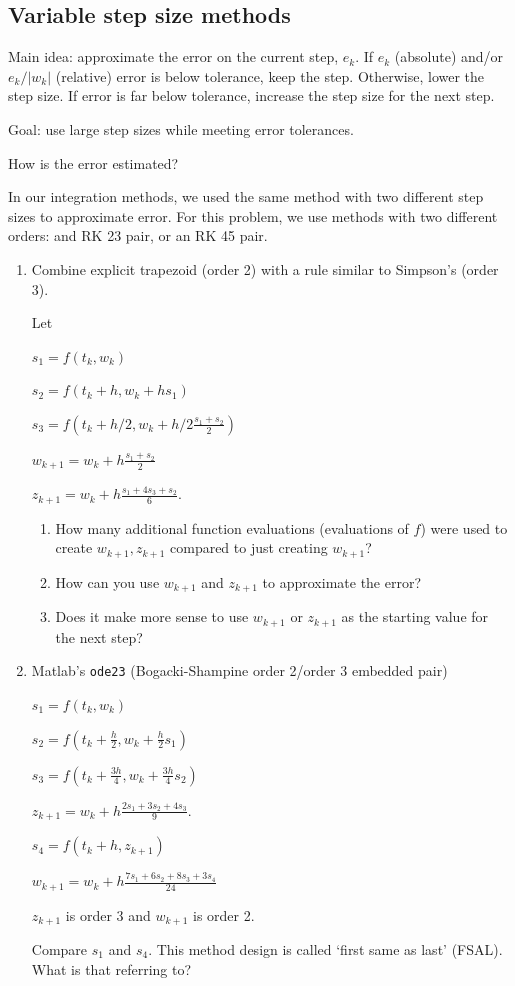 \documentclass[12pt,letterpaper,noanswers]{exam}
\begin{document}
\subsection*{Variable step size methods}

Main idea: approximate the error on the current step, $e_k$.  If $e_k$ (absolute) and/or $e_k/\vert w_k\vert$ (relative) error is below tolerance, keep the step.  Otherwise, lower the step size.  If error is far below tolerance, increase the step size for the next step.

Goal: use large step sizes while meeting error tolerances.

How is the error estimated?

In our integration methods, we used the same method with two different step sizes to approximate error.  For this problem, we use methods with two different orders: and RK 23 pair, or an RK 45 pair.

\begin{enumerate}[resume]
\item Combine explicit trapezoid (order 2) with a rule similar to Simpson's (order 3).

Let

$s_1 = f(t_k,w_k)$

$s_2 = f(t_k + h, w_k + hs_1)$

$s_3 = f\left(t_k+ h/2, w_k + h/2\frac{s_1+s_2}{2}\right)$

$w_{k+1} = w_k + h\frac{s_1+s_2}{2}$

$z_{k+1} = w_k + h\frac{s_1+4s_3+s_2}{6}$.

\begin{enumerate}
\item How many additional function evaluations (evaluations of $f$) were used to create $w_{k+1}, z_{k+1}$ compared to just creating $w_{k+1}$?

\item How can you use $w_{k+1}$ and $z_{k+1}$ to approximate the error?

\item Does it make more sense to use $w_{k+1}$ or $z_{k+1}$ as the starting value for the next step?
\end{enumerate}
\item Matlab's \texttt{ode23} (Bogacki-Shampine order 2/order 3 embedded pair)

$s_1 = f(t_k,w_k)$

$s_2 = f(t_k + \frac{h}{2}, w_k + \frac{h}{2}s_1)$

$s_3 = f(t_k + \frac{3h}{4}, w_k + \frac{3h}{4}s_2)$

$z_{k+1} = w_k + h\frac{2s_1+3s_2+4s_3}{9}$.

$s_4 = f(t_k+ h, z_{k+1})$

$w_{k+1} = w_k + h\frac{7s_1+6s_2+8s_3+3s_4}{24}$

$z_{k+1}$ is order 3 and $w_{k+1}$ is order 2.

Compare $s_1$ and $s_4$.  This method design is called `first same as last' (FSAL).  What is that referring to?

\end{enumerate}
\end{document}
